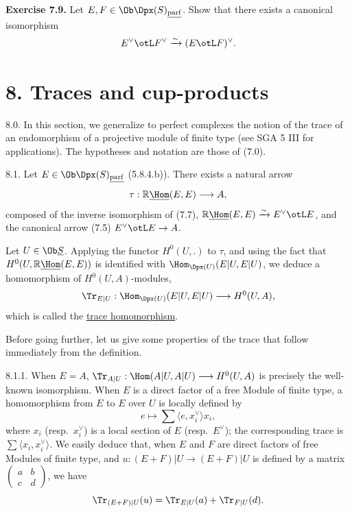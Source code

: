 %
\textbf{Exercise 7.9.} Let \(E,F\in\Ob\Dpx(S)_{\underline{\mathrm{parf}}}\). Show that there exists a canonical isomorphism
\[
  E^\vee\otL F^\vee \xrightarrow{\sim} (E\otL F)^\vee .
\]

\section*{8. Traces and cup-products}

8.0. In this section, we generalize to perfect complexes the notion of the trace of an endomorphism of a projective module of finite type (see SGA 5 III for applications). The hypotheses and notation are those of (7.0).

8.1. Let \(E\in\Ob\Dpx(S)_{\underline{\mathrm{parf}}}\) (5.8.4.b)). There exists a natural arrow
\[
  \tau:\mathbb{R}\underline{\Hom}(E,E)\longrightarrow A,
\]
composed of the inverse isomorphism of (7.7), \(\mathbb{R}\underline{\Hom}(E,E)\xrightarrow{\sim}E^\vee\otL E\), and the canonical arrow (7.5) \(E^\vee\otL E\to A\).

Let \(U\in\Ob \underline{S}\). Applying the functor \(H^0(U,.)\) to \(\tau\), and using the fact that \(H^0(U,\mathbb{R}\underline{\Hom}(E,E))\) is identified with \(\Hom_{\Dpx(U)}(E|U,E|U)\), we deduce a homomorphism of \(H^0(U,A)\)-modules,
\[
  \Tr_{E|U}:\Hom_{\Dpx(U)}(E|U,E|U)\longrightarrow H^0(U,A),
\]
which is called the \uline{trace homomorphism}.

Before going further, let us give some properties of the trace that follow immediately from the definition.

%
8.1.1. When \(E=A\), \(\Tr_{A|U}:\Hom(A|U,A|U)\longrightarrow H^0(U,A)\) is precisely the well-known isomorphism. When \(E\) is a direct factor of a free Module of finite type, a homomorphism from \(E\) to \(E\) over \(U\) is locally defined by
\[
  e\longmapsto \sum\langle e,x_i^\vee\rangle x_i,
\]
where \(x_i\) (resp.\ \(x_i^\vee\)) is a local section of \(E\) (resp.\ \(E^\vee\)); the corresponding trace is \(\sum\langle x_i,x_i^\vee\rangle\). We easily deduce that, when \(E\) and \(F\) are direct factors of free Modules of finite type, and \(u:(E+F)|U\longrightarrow(E+F)|U\) is defined by a matrix \(\begin{pmatrix}a&b\\ c&d\end{pmatrix}\), we have
\[
  \Tr_{(E+F)|U}(u)=\Tr_{E|U}(a)+\Tr_{F|U}(d).
\]

